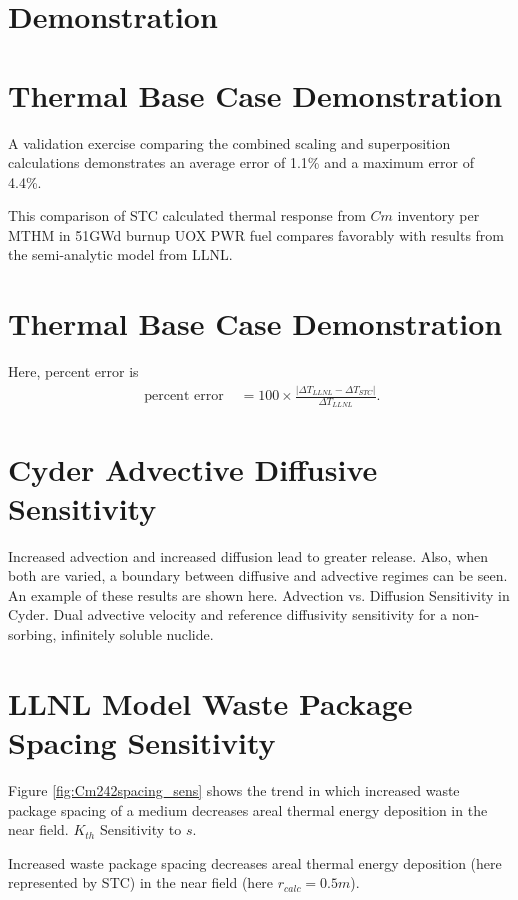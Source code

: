 \documentclass[letterpaper]{article}
\begin{document}
\section{Demonstration}


\begin{frame}[ctb!]
  \section*{Thermal Base Case Demonstration}
A validation exercise comparing the combined scaling and  
superposition calculations demonstrates an average error of 1.1\% and a 
maximum error of 4.4\%.

This comparison of STC calculated thermal response from $Cm$ 
inventory per MTHM in 51GWd burnup UOX PWR fuel compares favorably with results 
from the semi-analytic model from LLNL.


  \section*{Thermal Base Case Demonstration}
Here, percent error is 
\begin{align}
\mbox{ percent error } &= 100\times\frac{\left|\Delta T_{LLNL} - \Delta 
T_{STC}\right|}{ \Delta T_{LLNL}}.
\end{align}


\section*{Cyder Advective Diffusive Sensitivity}
Increased advection and increased diffusion lead to greater release. Also, when 
both are varied, a boundary between diffusive and advective
regimes can be seen. An example of these results are shown here.
Advection vs. Diffusion Sensitivity in Cyder. Dual advective velocity 
and reference diffusivity sensitivity for a non-sorbing, infinitely soluble 
nuclide.
\section*{LLNL Model Waste Package Spacing Sensitivity}
  Figure \ref{fig:Cm242spacing_sens} shows the trend in which increased waste 
  package spacing of a medium decreases areal thermal energy 
  deposition in the near field.
  $K_{th}$ Sensitivity to $s$.
  
  Increased waste package 
  spacing decreases areal thermal energy deposition 
  (here represented by STC) in the near field (here $r_{calc} = 0.5m$).



\end{frame}
\end{document}
